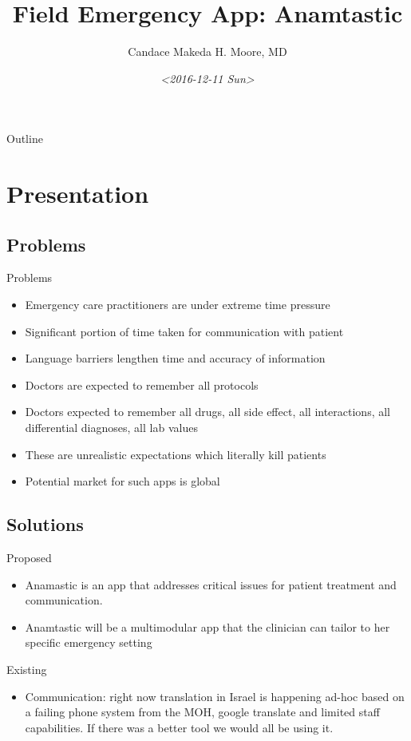 \documentclass[presentation]{beamer}
\author{Candace Makeda H. Moore, MD}
\date{\textit{<2016-12-11 Sun>}}
\title{Field Emergency App: Anamtastic}
\begin{document}
\maketitle
\begin{frame}{Outline}
\tableofcontents
\end{frame}


\section{Presentation}
\label{sec-1}
\subsection{Problems}
\label{sec-1-1}
\begin{frame}[label=sec-1-1-1]{Problems}
\begin{itemize}
\item Emergency care practitioners are under extreme time pressure
\item Significant portion of time taken for communication with  patient
\item Language barriers lengthen time and accuracy of information
\item Doctors are expected to remember all protocols
\item Doctors expected to remember all drugs, all side effect, all
interactions, all differential diagnoses, all lab values
\item These are unrealistic expectations which literally kill patients
\item Potential market for such apps is global
\end{itemize}
\end{frame}

\subsection{Solutions}
\label{sec-1-2}
\begin{frame}[label=sec-1-2-1]{Proposed}
\begin{itemize}
\item Anamastic is an app that addresses critical issues for patient
treatment and communication.
\item Anamtastic will be a multimodular app that the clinician can
tailor to her specific emergency setting
\end{itemize}
\end{frame}

\begin{frame}[label=sec-1-2-2]{Existing}
\begin{itemize}
\item Communication: right now translation in Israel is happening
ad-hoc based on a failing phone system from the MOH, google
translate and limited staff capabilities. If there was a better
tool we would all be using it.
\end{itemize}
\end{frame}
\end{document}
